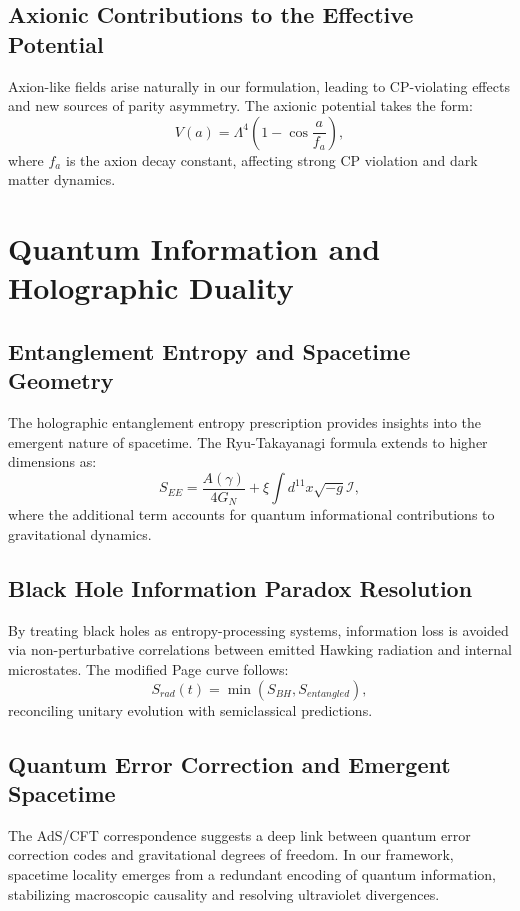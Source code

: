 \documentclass{article}
\begin{document}
\subsection{Axionic Contributions to the Effective Potential}
Axion-like fields arise naturally in our formulation, leading to CP-violating effects and new sources of parity asymmetry. The axionic potential takes the form:
\begin{equation}
V(a) = \Lambda^4 \left( 1 - \cos \frac{a}{f_a} \right),
\end{equation}
where $f_a$ is the axion decay constant, affecting strong CP violation and dark matter dynamics.

\section{Quantum Information and Holographic Duality}

\subsection{Entanglement Entropy and Spacetime Geometry}
The holographic entanglement entropy prescription provides insights into the emergent nature of spacetime. The Ryu-Takayanagi formula extends to higher dimensions as:
\begin{equation}
S_{EE} = \frac{A(\gamma)}{4G_N} + \xi \int d^{11}x \sqrt{-g} \mathcal{I},
\end{equation}
where the additional term accounts for quantum informational contributions to gravitational dynamics.

\subsection{Black Hole Information Paradox Resolution}
By treating black holes as entropy-processing systems, information loss is avoided via non-perturbative correlations between emitted Hawking radiation and internal microstates. The modified Page curve follows:
\begin{equation}
S_{rad}(t) = \min \left( S_{BH}, S_{entangled} \right),
\end{equation}
reconciling unitary evolution with semiclassical predictions.

\subsection{Quantum Error Correction and Emergent Spacetime}
The AdS/CFT correspondence suggests a deep link between quantum error correction codes and gravitational degrees of freedom. In our framework, spacetime locality emerges from a redundant encoding of quantum information, stabilizing macroscopic causality and resolving ultraviolet divergences.
\end{document}
